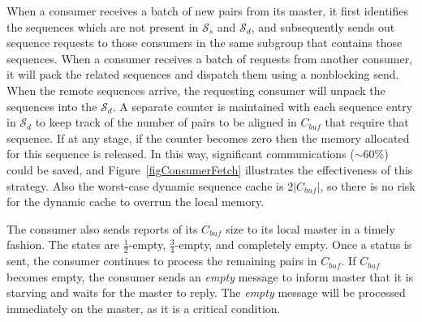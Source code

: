 \documentclass[10pt,journal,letterpaper,compsoc]{IEEEtran}
\begin{document}
When a consumer receives a batch of new pairs from its master, it first identifies the sequences which are not present in $\mathcal{S}_{s}$ and $\mathcal{S}_{d}$, and subsequently sends out sequence requests to those consumers in the same subgroup that contains those sequences. When a consumer receives a batch of requests from another consumer, it will pack the related sequences and dispatch them using a nonblocking send.  When the remote sequences arrive, the requesting consumer will unpack the sequences into the $\mathcal{S}_{d}$. A separate counter is maintained with each sequence entry in $\mathcal{S}_{d}$ to keep track of the number of pairs to be aligned in $C_{buf}$ that require that sequence. If at any stage, if the counter becomes zero then the memory allocated for this sequence is released. In this way, significant communications ($\sim 60$\%) could be saved, and Figure~\ref{figConsumerFetch} illustrates the effectiveness of this strategy. Also the worst-case dynamic sequence cache is $2|C_{buf}|$, so there is no risk for the dynamic cache to overrun the local memory.

The consumer also sends reports of its $C_{buf}$ size to its local master in a timely fashion. The states are $\frac{1}{2}$-empty, $\frac{3}{4}$-empty, and completely empty. Once a status is sent, the consumer continues to process the remaining pairs in $C_{buf}$. 
If $C_{buf}$ becomes empty, the consumer sends an {\it empty} message to inform master that it is starving and waits for the master to reply. The {\it empty} message will be processed immediately on the master, as it is a critical condition. \\
\end{document}
